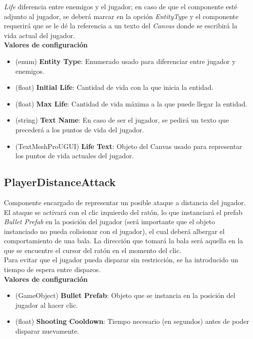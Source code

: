 \textit{Life} diferencia entre enemigos y el jugador; en caso de que el componente esté adjunto al jugador, se deberá marcar en la opción \textit{EntityType} y el componente requerirá que se le dé la referencia a un texto del \textit{Canvas} donde se escribirá la vida actual del jugador.\\

\textbf{Valores de configuración}
\begin{itemize}
	\item (enum) \textbf{Entity Type}: Enumerado usado para diferenciar entre jugador y enemigos.
	\item (float) \textbf{Initial Life}: Cantidad de vida con la que inicia la entidad.
	\item (float) \textbf{Max Life}: Cantidad de vida máxima a la que puede llegar la entidad.
	\item (string) \textbf{Text Name}: En caso de ser el jugador, se pedirá un texto que precederá a los puntos de vida del jugador.
	\item (TextMeshProUGUI) \textbf{Life Text}: Objeto del Canvas usado para representar los puntos de vida actuales del jugador.
\end{itemize}

\subsection{PlayerDistanceAttack}

Componente encargado de representar un posible ataque a distancia del jugador. El ataque se activará con el clic izquierdo del ratón, lo que instanciará el prefab \textit{Bullet Prefab} en la posición del jugador (será importante que el objeto instanciado no pueda colisionar con el jugador), el cual deberá albergar el comportamiento de una bala. La dirección que tomará la bala será aquella en la que se encuentre el cursor del ratón en el momento del clic.\\

Para evitar que el jugador pueda disparar sin restricción, se ha introducido un tiempo de espera entre disparos.\\

\textbf{Valores de configuración}
\begin{itemize}
	\item (GameObject) \textbf{Bullet Prefab}: Objeto que se instancia en la posición del jugador al hacer clic.
	\item (float) \textbf{Shooting Cooldown}: Tiempo necesario (en segundos) antes de poder disparar nuevamente.
\end{itemize}
